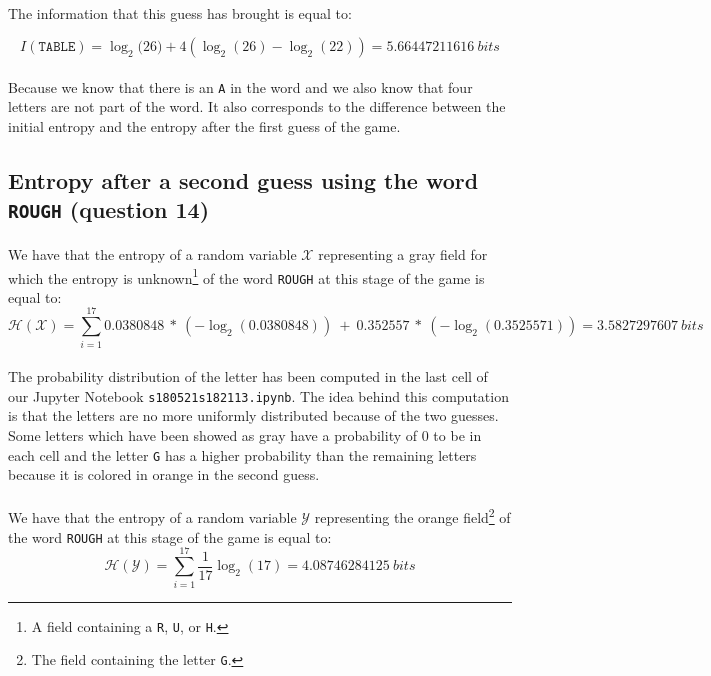 \documentclass[a4paper, 11pt, oneside]{article}
\begin{document}
\paragraph{}The information that this guess has brought is equal to:

$$I(\texttt{TABLE}) = \log_2{(26}) + 4 \left(\log_2{(26)} - \log_2(22)\right) = 5.66447211616 \ bits$$

\paragraph{}Because we know that there is an \texttt{A} in the word and we also know that four letters are not part of the word. It also corresponds to the difference between the initial entropy and the entropy after the first guess of the game. 

\subsection{Entropy after a second guess using the word \texttt{ROUGH} (question 14)}

\paragraph{}We have that the entropy of a random variable $\mathcal{X}$ representing a gray field for which the entropy is unknown\footnote{A field containing a \texttt{R}, \texttt{U}, or \texttt{H}.} of the word \texttt{ROUGH} at this stage of the game is equal to:
$$ \mathcal{H}(\mathcal{X}) = \sum_{i=1}^{17} 0.0380848 \ * \ (- \log_2{(0.0380848)}) \ + \ 0.352557 \ * \ (- \log_2{(0.3525571)}) = 3.5827297607\ bits $$
\paragraph{}The probability distribution of the letter has been computed in the last cell of our Jupyter Notebook \texttt{s180521s182113.ipynb}. The idea behind this computation is that the letters are no more uniformly distributed because of the two guesses. Some letters which have been showed as 
gray have a probability of 0 to be in each cell and the letter \texttt{G} has a higher probability than the remaining letters because it is colored in orange in the second guess.

\paragraph{}We have that the entropy of a random variable  $\mathcal{Y}$ representing the orange field\footnote{The field containing the letter \texttt{G}.} of the word \texttt{ROUGH} at this stage of the game is equal to:
$$ \mathcal{H}(\mathcal{Y}) = \sum_{i=1}^{17} \frac{1}{17} \log_2{(17)} = 4.08746284125 \ bits $$
\end{document}
